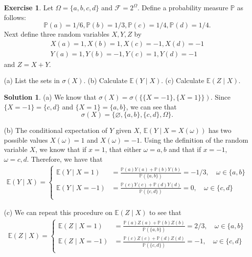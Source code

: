 \documentclass[12pt]{article}
\newcommand{\Prob}{\mathbb{P}}
\newcommand{\calF}{\mathcal{F}}
\newcommand{\Expect}{\mathbb{E}}
\theoremstyle{definition}
\newtheorem{exer}{Exercise}
\newtheorem{sol}{Solution}
\theoremstyle{remark}
\begin{document}
\begin{exer}
    Let $\Omega = \{ a, b, c, d\}$ and $\calF = 2^\Omega$. Define a probability measure $\Prob$ as follows:
    \begin{equation}
        \Prob(a) = 1/6, \Prob(b) = 1/3, \Prob(c) = 1/4, \Prob(d) = 1/4.
    \end{equation}
Next define three random variables $X, Y, Z$ by
\begin{align}
    X(a) = 1, X(b) = 1, X(c) = -1, X(d) = -1 \\
    Y(a) = 1, Y(b) = -1, Y(c) = 1, Y(d) = -1
\end{align}
and $Z = X + Y$. 

(a) List the sets in $\sigma(X)$. (b) Calculate $\Expect(Y\mid X)$. (c) Calculate $\Expect(Z\mid X)$.
\end{exer}

\begin{sol}\leavevmode

    (a) We know that $\sigma(X) = \sigma(\{ \{X = -1\}, \{X = 1\} \})$. Since $\{X = -1\} = \{ c,d \}$ and $\{X = 1\} = \{a,b\}$, we can see that 
    \begin{equation}
        \sigma(X) = \{\varnothing, \{a,b\}, \{c,d\}, \Omega \}.
    \end{equation}

    (b) The conditional expectation of $Y$ given $X$, $\Expect(Y\mid X = X(\omega))$ has two possible values $X(\omega)=1$ and $X(\omega)=-1$. Using the definition of the random variable $X$, we know that if $x = 1$, that either $\omega = a, b$ and that if $x=-1$, $\omega = c,d$. Therefore, we have that
    \begin{align}
        \Expect(Y\mid X) = \begin{cases}
            \Expect(Y\mid X = 1) &= \frac{\Prob(a)Y(a) + \Prob(b)Y(b)}{\Prob(\{a,b\})} = -1/3, \quad \omega \in \{a,b\} \\
            \Expect(Y\mid X = -1) &=\frac{\Prob(c)Y(c) + \Prob(d)Y(d)}{\Prob(\{c,d\})} = 0, \quad \omega \in \{c,d\}\\
        \end{cases}
    \end{align}

    (c) We can repeat this procedure on $\Expect(Z\mid X)$ to see that 
    \begin{align}
        \Expect(Z\mid X) = \begin{cases}
            \Expect(Z\mid X = 1) &= \frac{\Prob(a)Z(a) + \Prob(b)Z(b)}{\Prob(\{a,b\})} = 2/3 , \quad \omega \in \{a,b\} \\
            \Expect(Z\mid X = -1) &=\frac{\Prob(c)Z(c) + \Prob(d)Z(d)}{\Prob(\{c,d\})} = -1 , \quad \omega \in \{c,d\}\\
        \end{cases}
    \end{align}

\end{sol}
\end{document}
